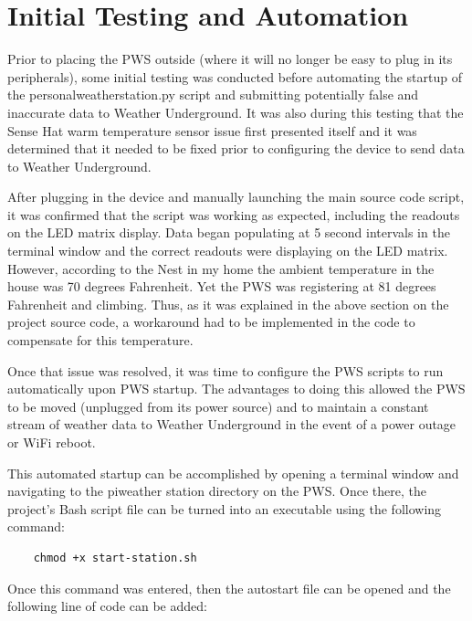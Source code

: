 \documentclass[sigconf]{acmart}
\begin{document}
\section{Initial Testing and Automation}

Prior to placing the PWS outside (where it will no longer be easy to plug in its peripherals), some initial testing was conducted before automating the startup of the personal\textunderscore weather\textunderscore station.py script and submitting potentially false and inaccurate data to Weather Underground. It was also during this testing that the Sense Hat warm temperature sensor issue first presented itself and it was determined that it needed to be fixed prior to configuring the device to send data to Weather Underground. 

After plugging in the device and manually launching the main source code script, it was confirmed that the script was working as expected, including the readouts on the LED matrix display. Data began populating at 5 second intervals in the terminal window and the correct readouts were displaying on the LED matrix. However, according to the Nest in my home the ambient temperature in the house was 70 degrees Fahrenheit. Yet the PWS was registering at 81 degrees Fahrenheit and climbing. Thus, as it was explained in the above section on the project source code, a workaround had to be implemented in the code to compensate for this temperature. 

Once that issue was resolved, it was time to configure the PWS scripts to run automatically upon PWS startup. The advantages to doing this allowed the PWS to be moved (unplugged from its power source) and to maintain a constant stream of weather data to Weather Underground in the event of a power outage or WiFi reboot. 

This automated startup can be accomplished by opening a terminal window and navigating to the pi\textunderscore weather \textunderscore station directory on the PWS. Once there, the project's Bash script file can be turned into an executable using the following command:

\begin{code}
\begin{verbatim}
    chmod +x start-station.sh
\end{verbatim}
\end{code}

Once this command was entered, then the autostart file can be opened and the following line of code can be added:
\end{document}

